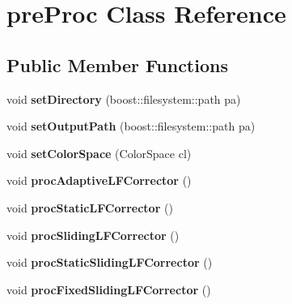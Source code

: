 \hypertarget{classpreProc}{}\section{pre\+Proc Class Reference}
\label{classpreProc}
\subsection*{Public Member Functions}
\begin{DoxyCompactItemize}
\item 
void {\bfseries set\+Directory} (boost\+::filesystem\+::path pa)\hypertarget{classpreProc_a16a97a7ce0592290bfbaece440309da8}{}\label{classpreProc_a16a97a7ce0592290bfbaece440309da8}

\item 
void {\bfseries set\+Output\+Path} (boost\+::filesystem\+::path pa)\hypertarget{classpreProc_a4b6e3fcf913ce6271f8b3973a513e04b}{}\label{classpreProc_a4b6e3fcf913ce6271f8b3973a513e04b}

\item 
void {\bfseries set\+Color\+Space} (Color\+Space cl)\hypertarget{classpreProc_ab8fc0a76a2227fa289a1cb0d028aca92}{}\label{classpreProc_ab8fc0a76a2227fa289a1cb0d028aca92}

\item 
void {\bfseries proc\+Adaptive\+L\+F\+Corrector} ()\hypertarget{classpreProc_ab8f18f3943a2b1a8a3d477bf79e30d85}{}\label{classpreProc_ab8f18f3943a2b1a8a3d477bf79e30d85}

\item 
void {\bfseries proc\+Static\+L\+F\+Corrector} ()\hypertarget{classpreProc_a660a388f38209d081af87c21ca20dc4c}{}\label{classpreProc_a660a388f38209d081af87c21ca20dc4c}

\item 
void {\bfseries proc\+Sliding\+L\+F\+Corrector} ()\hypertarget{classpreProc_a965eece88ebb4f63d9b5fd77a7de19cf}{}\label{classpreProc_a965eece88ebb4f63d9b5fd77a7de19cf}

\item 
void {\bfseries proc\+Static\+Sliding\+L\+F\+Corrector} ()\hypertarget{classpreProc_a046848306f63e931896afaccd8d97629}{}\label{classpreProc_a046848306f63e931896afaccd8d97629}

\item 
void {\bfseries proc\+Fixed\+Sliding\+L\+F\+Corrector} ()\hypertarget{classpreProc_a44778c494c12e9878388919cd9e9e7d3}{}\label{classpreProc_a44778c494c12e9878388919cd9e9e7d3}


\end{DoxyCompactItemize}
